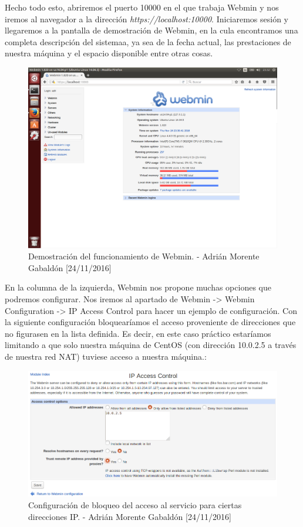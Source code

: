 Hecho todo esto, abriremos el puerto 10000 en el que trabaja Webmin y nos iremos al navegador a la dirección \emph{https://localhost:10000}. Iniciaremos sesión y llegaremos a la pantalla de demostración de Webmin, en la cula encontramos una completa descripción del sistemaa, ya sea de la fecha actual, las prestaciones de nuestra máquina y el espacio disponible entre otras cosas.
\begin{figure}[H]
	\centering
	\includegraphics[scale=0.4]{webmin-start}
	\caption{Demostración del funcionamiento de Webmin. - Adrián Morente Gabaldón [24/11/2016]}
	\label{fig:figura17}
\end{figure}
En la columna de la izquierda, Webmin nos propone muchas opciones que podremos configurar. Nos iremos al apartado de Webmin -> Webmin Configuration -> IP Access Control para hacer un ejemplo de configuración. Con la siguiente configuración bloquearíamos el acceso proveniente de direcciones que no figurasen en la lista definida. Es decir, en este caso práctico estaríamos limitando a que solo nuestra máquina de CentOS (con dirección 10.0.2.5 a través de nuestra red NAT) tuviese acceso a nuestra máquina.:
\begin{figure}[H]
	\centering
	\includegraphics[scale=0.5]{webmin-change}
	\caption{Configuración de bloqueo del acceso al servicio para ciertas direcciones IP. - Adrián Morente Gabaldón [24/11/2016]}
	\label{fig:figura18}
\end{figure}


